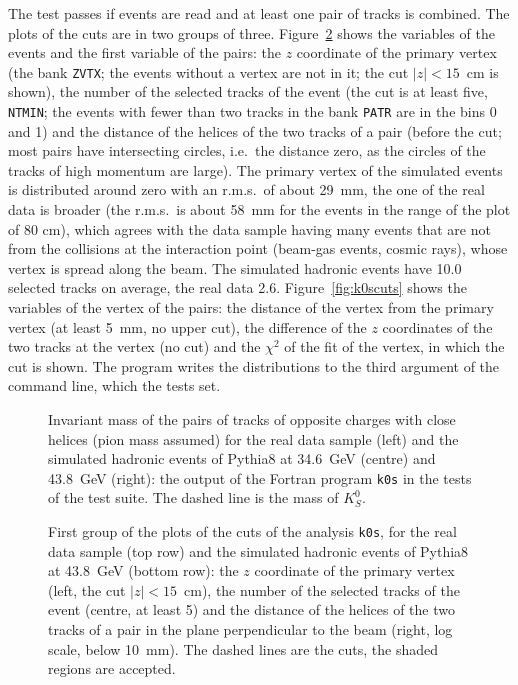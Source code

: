 The test passes if events are read and at least one pair of tracks is combined.
The plots of the cuts are in two groups of three. Figure~\ref{fig:k0sevent} shows the variables of the events and the first variable of the pairs: the $z$ coordinate of the primary vertex (the bank \texttt{ZVTX}; the events without a vertex are not in it; the cut $|z|<15$~cm is shown), the number of the selected tracks of the event (the cut is at least five, \texttt{NTMIN}; the events with fewer than two tracks in the bank \texttt{PATR} are in the bins 0 and 1) and the distance of the helices of the two tracks of a pair (before the cut; most pairs have intersecting circles, i.e.\ the distance zero, as the circles of the tracks of high momentum are large). The primary vertex of the simulated events is distributed around zero with an r.m.s.\ of about 29~mm, the one of the real data is broader (the r.m.s.\ is about 58~mm for the events in the range of the plot of 80 cm), which agrees with the data sample having many events that are not from the collisions at the interaction point (beam-gas events, cosmic rays), whose vertex is spread along the beam. The simulated hadronic events have 10.0 selected tracks on average, the real data 2.6.
Figure~\ref{fig:k0scuts} shows the variables of the vertex of the pairs: the distance of the vertex from the primary vertex (at least 5~mm, no upper cut), the difference of the $z$ coordinates of the two tracks at the vertex (no cut) and the $\chi^2$ of the fit of the vertex, in which the cut is shown. The program writes the distributions to the third argument of the command line, which the tests set.
\begin{figure}[H]
\centering
{}
\caption{Invariant mass of the pairs of tracks of opposite charges with close helices (pion mass assumed) for the real data sample (left) and the simulated hadronic events of Pythia8 at 34.6~GeV (centre) and 43.8~GeV (right):
the output of the Fortran program \texttt{k0s} in the tests of the test suite. The dashed line is the mass of $K^0_S$.}
\label{fig:k0s}
\end{figure}
\begin{figure}[H]
\centering
{}
\caption{First group of the plots of the cuts of the analysis \texttt{k0s}, for the real data sample (top row) and the simulated hadronic events of Pythia8 at 43.8~GeV (bottom row): the $z$ coordinate of the primary vertex (left, the cut $|z|<15$~cm), the number of the selected tracks of the event (centre, at least 5) and the distance of the helices of the two tracks of a pair in the plane perpendicular to the beam (right, log scale, below 10~mm). The dashed lines are the cuts, the shaded regions are accepted.}
\label{fig:k0sevent}
\end{figure}

